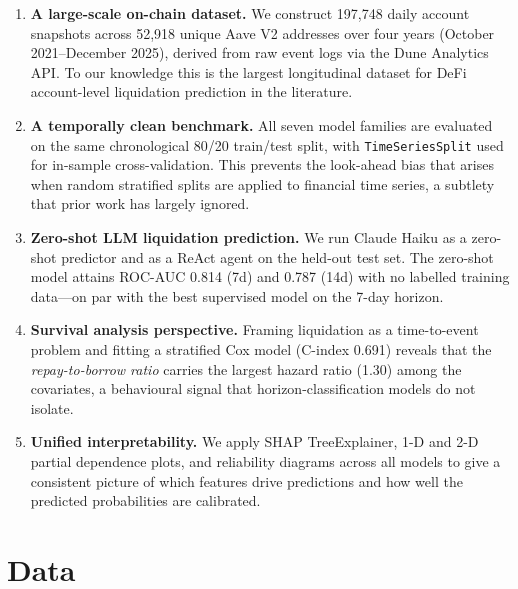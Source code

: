 \documentclass[12pt,a4paper]{article}
\begin{document}
\begin{enumerate}[leftmargin=*, label=\textbf{C\arabic*.}]

    \item \textbf{A large-scale on-chain dataset.}
    We construct 197{,}748 daily account snapshots across 52{,}918 unique
    Aave V2 addresses over four years (October 2021--December 2025), derived
    from raw event logs via the Dune Analytics API.  To our knowledge this is
    the largest longitudinal dataset for DeFi account-level liquidation
    prediction in the literature.

    \item \textbf{A temporally clean benchmark.}
    All seven model families are evaluated on the same chronological
    80/20 train/test split, with \texttt{TimeSeriesSplit} used for
    in-sample cross-validation.  This prevents the look-ahead bias that
    arises when random stratified splits are applied to financial time series,
    a subtlety that prior work has largely ignored.

    \item \textbf{Zero-shot LLM liquidation prediction.}
    We run Claude Haiku as a zero-shot predictor and as a ReAct agent on the
    held-out test set.  The zero-shot model attains ROC-AUC 0.814 (7d) and
    0.787 (14d) with no labelled training data---on par with the best
    supervised model on the 7-day horizon.

    \item \textbf{Survival analysis perspective.}
    Framing liquidation as a time-to-event problem and fitting a stratified
    Cox model (C-index 0.691) reveals that the \emph{repay-to-borrow ratio}
    carries the largest hazard ratio (1.30) among the covariates, a
    behavioural signal that horizon-classification models do not isolate.

    \item \textbf{Unified interpretability.}
    We apply SHAP TreeExplainer, 1-D and 2-D partial dependence plots, and
    reliability diagrams across all models to give a consistent picture of
    which features drive predictions and how well the predicted probabilities
    are calibrated.

\end{enumerate}


\section{Data}
\label{sec:data}
\end{document}

